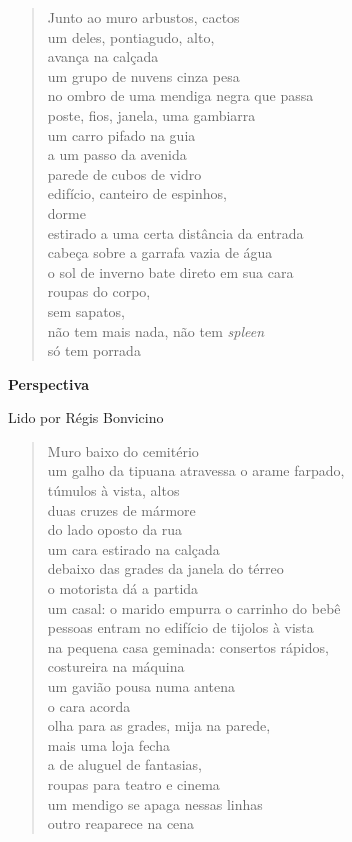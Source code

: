 \begin{verse}
Junto ao muro arbustos, cactos\\
um deles, pontiagudo, alto,\\
avança na calçada\\
um grupo de nuvens cinza pesa\\
no ombro de uma mendiga negra que passa\\
poste, fios, janela, uma gambiarra\\
um carro pifado na guia\\
a um passo da avenida\\
parede de cubos de vidro\\
edifício, canteiro de espinhos,\\
dorme\\
estirado a uma certa distância da entrada\\
cabeça sobre a garrafa vazia de água\\
o sol de inverno bate direto em sua cara\\
roupas do corpo,\\
sem sapatos,\\
não tem mais nada, não tem \emph{spleen}\\
só tem porrada
\end{verse}

\pagebreak

\textbf{Perspectiva}

Lido por Régis Bonvicino

\begin{verse}
Muro baixo do cemitério\\
um galho da tipuana atravessa o arame farpado,\\
túmulos à vista, altos\\
duas cruzes de mármore\\[5pt]
do lado oposto da rua\\
um cara estirado na calçada\\
debaixo das grades da janela do térreo\\
o motorista dá a partida\\[5pt]
um casal: o marido empurra o carrinho do bebê\\
pessoas entram no edifício de tijolos à vista\\
na pequena casa geminada: consertos rápidos,\\
costureira na máquina\\[5pt]
um gavião pousa numa antena\\
o cara acorda\\
olha para as grades, mija na parede,\\
mais uma loja fecha\\[5pt]
a de aluguel de fantasias,\\
roupas para teatro e cinema\\
um mendigo se apaga nessas linhas\\
outro reaparece na cena
\end{verse}

